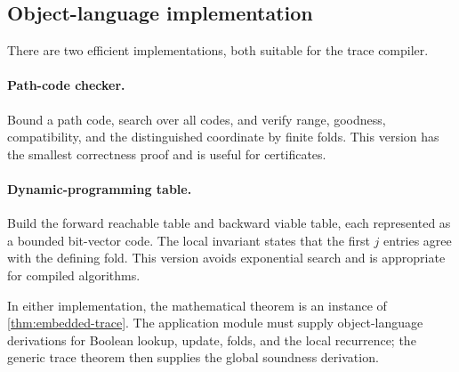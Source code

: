\subsection{Object-language implementation}

There are two efficient implementations, both suitable for the trace compiler.

\paragraph{Path-code checker.}
Bound a path code, search over all codes, and verify range, goodness,
compatibility, and the distinguished coordinate by finite folds.  This version
has the smallest correctness proof and is useful for certificates.

\paragraph{Dynamic-programming table.}
Build the forward reachable table and backward viable table, each represented
as a bounded bit-vector code.  The local invariant states that the first
\(j\) entries agree with the defining fold.  This version avoids exponential
search and is appropriate for compiled algorithms.

In either implementation, the mathematical theorem is an instance of
\cref{thm:embedded-trace}.  The application module must supply object-language
derivations for Boolean lookup, update, folds, and the local recurrence; the
generic trace theorem then supplies the global soundness derivation.
